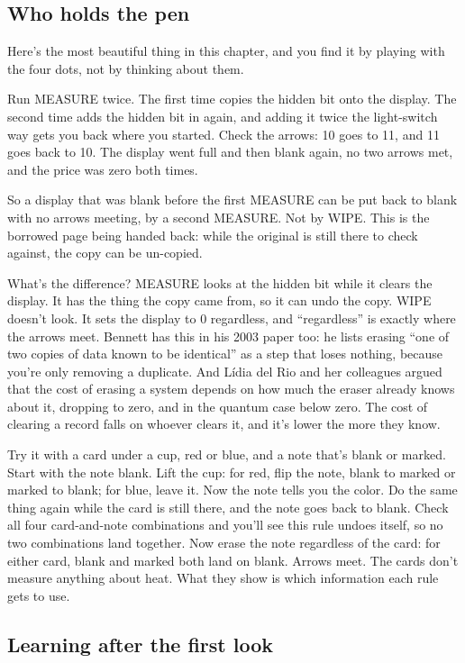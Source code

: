\documentclass[11pt,twoside]{article}
\theoremstyle{thielethm}
\theoremstyle{thieledef}
\theoremstyle{thieledef}
\theoremstyle{thieledef}
\theoremstyle{thielethm}
\theoremstyle{thieleobs}
\theoremstyle{thielethm}
\begin{document}
\subsection{Who holds the pen}

Here's the most beautiful thing in this chapter, and you find it by playing with the four dots, not by thinking about them.

Run MEASURE twice. The first time copies the hidden bit onto the display. The second time adds the hidden bit in again, and adding it twice the light-switch way gets you back where you started. Check the arrows: 10 goes to 11, and 11 goes back to 10. The display went full and then blank again, no two arrows met, and the price was zero both times.

So a display that was blank before the first MEASURE can be put back to blank with no arrows meeting, by a second MEASURE. Not by WIPE. This is the borrowed page being handed back: while the original is still there to check against, the copy can be un-copied.

What's the difference? MEASURE looks at the hidden bit while it clears the display. It has the thing the copy came from, so it can undo the copy. WIPE doesn't look. It sets the display to 0 regardless, and ``regardless'' is exactly where the arrows meet. Bennett has this in his 2003 paper too: he lists erasing ``one of two copies of data known to be identical'' as a step that loses nothing, because you're only removing a duplicate. And Lídia del Rio and her colleagues argued that the cost of erasing a system depends on how much the eraser already knows about it, dropping to zero, and in the quantum case below zero. The cost of clearing a record falls on whoever clears it, and it's lower the more they know.

Try it with a card under a cup, red or blue, and a note that's blank or marked. Start with the note blank. Lift the cup: for red, flip the note, blank to marked or marked to blank; for blue, leave it. Now the note tells you the color. Do the same thing again while the card is still there, and the note goes back to blank. Check all four card-and-note combinations and you'll see this rule undoes itself, so no two combinations land together. Now erase the note regardless of the card: for either card, blank and marked both land on blank. Arrows meet. The cards don't measure anything about heat. What they show is which information each rule gets to use.

\subsection{Learning after the first look}
\end{document}

